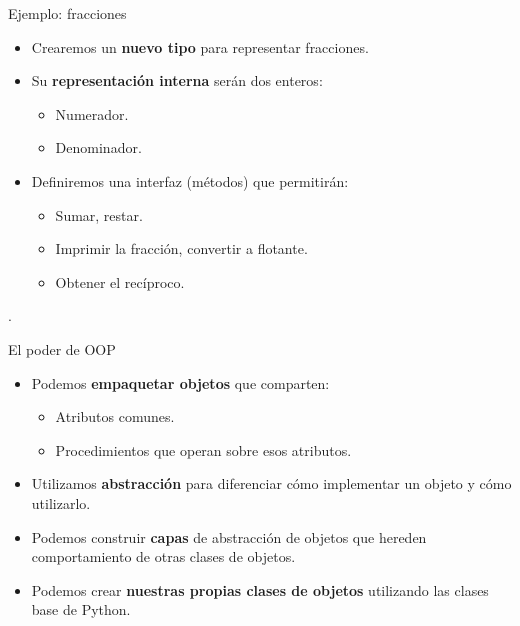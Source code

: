 \documentclass[mathserif]{beamer}
\begin{document}
\begin{frame}[fragile]{Ejemplo: fracciones}
    \begin{itemize}
        \item Crearemos un {\blue\bfseries nuevo tipo} para representar fracciones.
        
        \item Su {\blue\bfseries representación interna} serán dos enteros:
        \begin{itemize}
            \item Numerador.
            \item Denominador.
        \end{itemize}
        
         \item Definiremos una interfaz (métodos) que permitirán:
         \begin{itemize}
             \item Sumar, restar.
             \item Imprimir la fracción, convertir a flotante.
             \item Obtener el recíproco.
         \end{itemize}
    \end{itemize}
    .
\end{frame}

\begin{frame}[fragile]{El poder de OOP}
    \begin{itemize}
        \item Podemos {\blue\bfseries empaquetar objetos} que comparten:
        \begin{itemize}
            \item Atributos comunes.
            \item Procedimientos que operan sobre esos atributos.
        \end{itemize}
        
        \item Utilizamos {\blue\bfseries abstracción} para diferenciar cómo implementar un objeto y cómo utilizarlo.
        
        \item Podemos construir {\blue\bfseries capas} de abstracción de objetos que {\orange hereden} comportamiento de otras clases de objetos.
        
         \item Podemos crear {\blue\bfseries nuestras propias clases de objetos} utilizando las clases base de Python.
    \end{itemize}
\end{frame}
\end{document}
